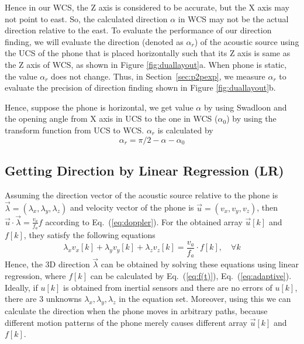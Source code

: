 \documentclass[]{sig-alternate-10pt}
\newcommand{\MYCUT}[1]{{ }}
\newcommand{\eqqref}[1]{Eq.~(\ref{#1})}
\def \ourprotocol{Swadloon\xspace}
\begin{document}
Hence in our WCS, the Z axis is  considered to be accurate, but the X
 axis may not point to east.
So, the calculated direction $\alpha$ in WCS may not be the actual
 direction relative  to the east.
To evaluate the performance of our direction finding,
 we will evaluate the direction (denoted as $\alpha_r$) of the
 acoustic source using the UCS
 of the phone that is placed horizontally such that its Z axis is same
 as the Z axis of WCS, as shown in
 Figure  \ref{fig:duallayout}a.
When phone is static, the value $\alpha_r$ does not change.
Thus, in Section~\ref{sec:p2pexp}, we measure $\alpha_r$ to evaluate the
 precision of direction finding shown in Figure \ref{fig:duallayout}b.


Hence, suppose the phone is horizontal, we
get value $\alpha$ by using \ourprotocol  and the opening angle from X axis in UCS to the one in WCS ($\alpha_0$) by using the
transform function from UCS to WCS. $\alpha_r$ is calculated by
\begin{equation}
\alpha_r=\pi/2-\alpha-\alpha_0
    \label{alpha_r}
\end{equation}

\subsection{Getting Direction by Linear Regression (LR)}

\MYCUT{In 3D world's coordinate system, where the X axis points toward East,
Y axis points to the North Pole, and Z axis points to the sky. In
this case, $\alpha$ is the direction in the projected 2D world's
coordinate system. }Assuming the direction vector of the acoustic
source relative to the phone is
$\overrightarrow{\lambda}=(\lambda_{x}, \lambda_{y}, \lambda_{z})$ and
velocity vector of the phone is $\overrightarrow{u}=(v_{x}, v_{y},
v_{z})$, then
$\overrightarrow{u}\cdot\overrightarrow{\lambda}=\frac{v_{a}}{f_{a}}f$
according to \eqqref{eq:doppler}.
For the obtained array $\overrightarrow{u}[k]$ and $f[k]$, they
satisfy the following equations
\begin{equation}
    \lambda_xv_x[k]+\lambda_yv_y[k]+\lambda_zv_z[k]=\frac{v_{a}}{f_{a}}\cdot
    f[k], \quad \forall k
    \label{eq:linearinitial}
\end{equation}
Hence, the 3D direction $\overrightarrow\lambda$ can be obtained by
solving these equations  using linear regression,
where $f[k]$ can be calculated by \eqqref{eq:f(t)}, \eqqref{eq:adaptive}.
Ideally, if $u[k]$ is obtained from inertial sensors and
there are no errors of $u[k]$, there are 3 unknowns
$\lambda_x,\lambda_y,\lambda_z$ in the equation set.
Moreover, using this we can calculate the direction
 when  the phone moves in arbitrary paths,
 because different motion patterns of the phone
 merely causes different array
 $\overrightarrow{u}[k]$ and $f[k]$.
\end{document}
